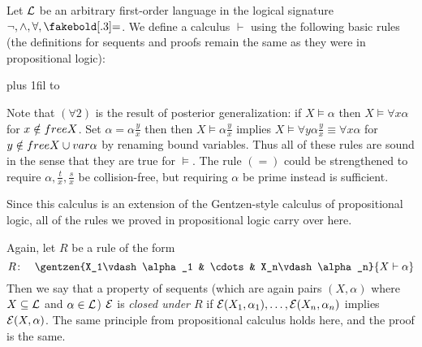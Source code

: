 Let ${\cal L}$ be an arbitrary first-order language in the logical signature $\neg,\land,\forall,\eq$.
We define a calculus $\vdash$ using the following basic rules (the definitions for sequents and proofs remain the same as they were in propositional logic):

\medskip
\tabskip=0pt plus 1fil
{\jot\halign to}
\medskip

Note that $(\forall2)$ is the result of posterior generalization: if $X\vDash\alpha$ then $X\vDash\forall x\alpha$ for $x\notin{\sl free} X$.
Set $\alpha=\alpha\frac yx$ then then $X\vDash\alpha\frac yx$ implies $X\vDash\forall y\alpha\frac yx\equiv\forall x\alpha$ for $y\notin{\sl free} X\cup{\sl var}\alpha$ by renaming bound variables.
Thus all of these rules are sound in the sense that they are true for $\vDash$.
The rule $(=)$ could be strengthened to require $\alpha,\frac tx,\frac sx$ be collision-free, but requiring $\alpha$ be prime instead is sufficient.

Since this calculus is an extension of the Gentzen-style calculus of propositional logic, all of the rules we proved in propositional logic carry over here.

Again, let $R$ be a rule of the form
$$ R\colon\quad \gentzen{X_1\vdash\alpha_1 & \cdots & X_n\vdash\alpha_n}{X\vdash\alpha} $$
Then we say that a property of sequents (which are again pairs $(X,\alpha)$ where $X\subseteq{\cal L}$ and $\alpha\in{\cal L}$) ${\cal E}$ is {\it closed under $R$} if
${\cal E}(X_1,\alpha_1),\dots,{\cal E}(X_n,\alpha_n)$ implies ${\cal E}(X,\alpha)$.
The same principle from propositional calculus holds here, and the proof is the same.

